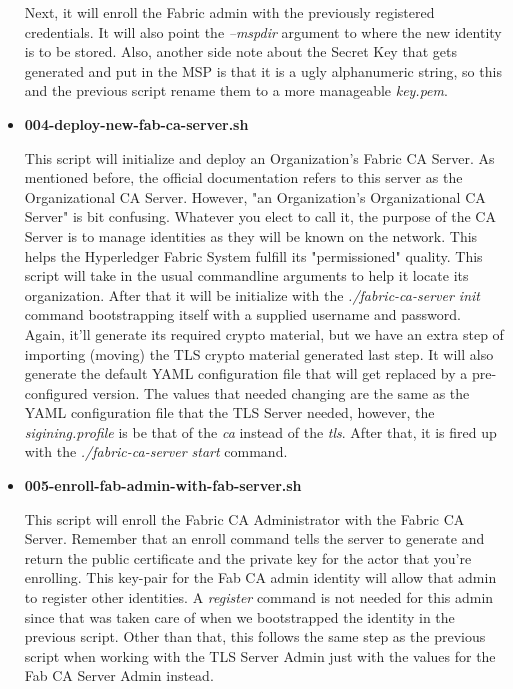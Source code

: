 \begin{itemize}
					\hspace{10mm}Next, it will enroll the Fabric admin with the previously registered credentials. It will also point the \textit{--mspdir} argument to where the new identity is to be stored. Also, another side note about the Secret Key that gets generated and put in the MSP is that it is a ugly alphanumeric string, so this and the previous script rename them to a more manageable \textit{key.pem}.
					
				\item \textbf{004-deploy-new-fab-ca-server.sh}
					
					\hspace{10mm}This script will initialize and deploy an Organization's Fabric CA Server. As mentioned before, the official documentation refers to this server as the Organizational CA Server. However, "an Organization's Organizational CA Server" is bit confusing. Whatever you elect to call it, the purpose of the CA Server is to manage identities as they will be known on the network. This helps the Hyperledger Fabric System fulfill its "permissioned" quality.	This script will take in the usual commandline arguments to help it locate its organization. After that it will be initialize with the \textit{./fabric-ca-server init} command bootstrapping itself with a supplied username and password. Again, it'll generate its required crypto material, but we have an extra step of importing (moving) the TLS crypto material generated last step. It will also generate the default YAML configuration file that will get replaced by a pre-configured version. The values that needed changing are the same as the YAML configuration file that the TLS Server needed, however, the \textit{sigining.profile} is be that of the \textit{ca} instead of the \textit{tls}. After that, it is fired up with the \textit{./fabric-ca-server start} command.
					
				\item \textbf{005-enroll-fab-admin-with-fab-server.sh}
				
					\hspace{10mm}This script will enroll the Fabric CA Administrator with the Fabric CA Server. Remember that an enroll command tells the server to generate and return the public certificate and the private key for the actor that you're enrolling. This key-pair for the Fab CA admin identity will allow that admin to register other identities. A \textit{register} command is not needed for this admin since that was taken care of when we bootstrapped the identity in the previous script. Other than that, this follows the same step as the previous script when working with the TLS Server Admin just with the values for the Fab CA Server Admin instead.
					

\end{itemize}
